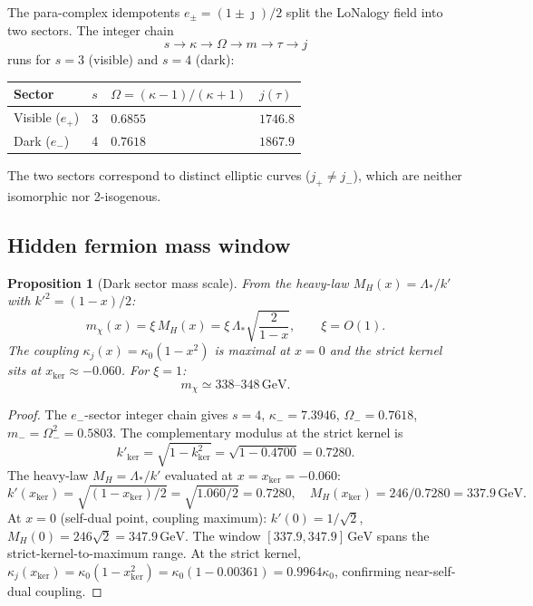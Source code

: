 \documentclass[12pt]{article}
\theoremstyle{plain}
\newtheorem{proposition}[theorem]{Proposition}
\theoremstyle{definition}
\numberwithin{equation}{section}
\newcommand{\kker}{\mathrm{ker}}
\begin{document}
The para-complex idempotents $e_\pm=(1\pm\jmath)/2$ split the LoNalogy
field into two sectors.  The integer chain
\[
s\to\kappa\to\Omega\to m\to\tau\to j
\]
runs for $s=3$ (visible) and $s=4$ (dark):

\begin{center}
\begin{tabular}{llll}
\toprule
Sector & $s$ & $\Omega=(\kappa-1)/(\kappa+1)$ & $j(\tau)$\\
\midrule
Visible ($e_+$) & 3 & $0.6855$ & $1746.8$\\
Dark ($e_-$) & 4 & $0.7618$ & $1867.9$\\
\bottomrule
\end{tabular}
\end{center}

The two sectors correspond to distinct elliptic curves ($j_+\neq j_-$),
which are neither isomorphic nor 2-isogenous.

\subsection{Hidden fermion mass window}

\begin{proposition}[Dark sector mass scale]\label{prop:darkmass}
From the heavy-law $M_H(x)=\Lambda_*/k'$ with $k'^2=(1-x)/2$:
\[
m_{\chi}(x) = \xi\, M_H(x) = \xi\,\Lambda_*\sqrt{\frac{2}{1-x}},\qquad \xi=O(1).
\]
The coupling $\kappa_j(x)=\kappa_0(1-x^2)$ is maximal at $x=0$ and the
strict kernel sits at $x_{\kker}\approx-0.060$.  For $\xi=1$:
\[
\boxed{m_\chi \simeq 338\text{--}348\,\mathrm{GeV}.}
\]
\end{proposition}

\begin{proof}
The $e_-$-sector integer chain gives $s=4$, $\kappa_-=7.3946$, $\Omega_-=0.7618$,
$m_-=\Omega_-^2=0.5803$.  The complementary modulus at the strict kernel is
\[
k'_{\kker}=\sqrt{1-k_{\kker}^2}=\sqrt{1-0.4700}=0.7280.
\]
The heavy-law $M_H=\Lambda_*/k'$ evaluated at $x=x_{\kker}=-0.060$:
\[
k'(x_{\kker})=\sqrt{(1-x_{\kker})/2}=\sqrt{1.060/2}=0.7280,\quad
M_H(x_{\kker})=246/0.7280=337.9\,\mathrm{GeV}.
\]
At $x=0$ (self-dual point, coupling maximum): $k'(0)=1/\sqrt{2}$,
$M_H(0)=246\sqrt{2}=347.9\,\mathrm{GeV}$.
The window $[337.9,347.9]\,\mathrm{GeV}$ spans the strict-kernel-to-maximum range.
At the strict kernel, $\kappa_j(x_{\kker})=\kappa_0(1-x_{\kker}^2)=\kappa_0(1-0.00361)=0.9964\kappa_0$,
confirming near-self-dual coupling.
\end{proof}
\end{document}
